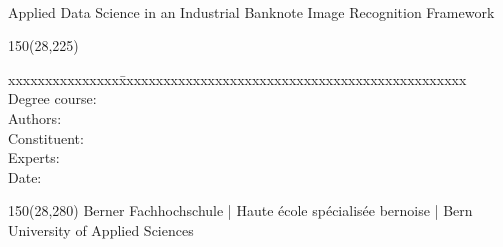 \begin{titlepage}
\begin{flushleft}
\vspace*{115mm}

\fontsize{24pt}{26pt}\selectfont 
\heading				\\							%
\vspace{2mm}

\fontsize{14pt}{18pt}\selectfont\vspace{0.3em}
Applied Data Science in an Industrial Banknote Image Recognition Framework			\\				%
\vspace{5mm}




\begin{textblock}{150}(28,225)
\fontsize{10pt}{17pt}\selectfont
\begin{tabbing}
xxxxxxxxxxxxxxx\=xxxxxxxxxxxxxxxxxxxxxxxxxxxxxxxxxxxxxxxxxxxxxxx \kill
Degree course:		\\		%
Authors:				\\					%
Constituent:						\\							%
Experts:						\\							%
Date:			\> \versiondate					\\							%
\end{tabbing}

\end{textblock}
\end{flushleft}

\begin{textblock}{150}(28,280)
\noindent 
\color{bfhgrey}\fontsize{9pt}{10pt}\selectfont
Berner Fachhochschule | Haute \'ecole sp\'ecialis\'ee bernoise | Bern University of Applied Sciences
\color{black}\selectfont
\end{textblock}


\end{titlepage}

%
%
